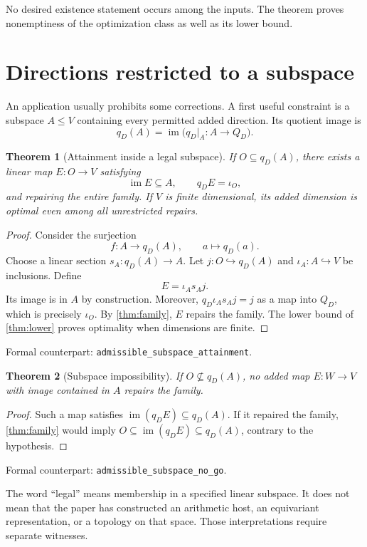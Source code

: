 \documentclass[11pt,letterpaper,oneside,openany]{book}
\theoremstyle{quiet}
\newtheorem{theorem}{Theorem}[chapter]
\DeclareMathOperator{\im}{im}
\newcommand{\formal}[1]{\par\nobreak\begingroup\footnotesize\color{Slate}\sffamily Formal counterpart: \normalfont\nolinkurl{#1}.\par\endgroup}
\begin{document}
No desired existence statement occurs among the inputs. The theorem proves nonemptiness of the optimization class as well as its lower bound.

\section{Directions restricted to a subspace}
An application usually prohibits some corrections. A first useful constraint is a subspace $A\leq V$ containing every permitted added direction. Its quotient image is
\[
q_D(A)=\im\bigl(q_D\vert_A:A\to Q_D\bigr).
\]

\begin{theorem}[Attainment inside a legal subspace]\label{thm:legal}
If $O\subseteq q_D(A)$, there exists a linear map $E:O\to V$ satisfying
\[
\im E\subseteq A,\qquad q_DE=\iota_O,
\]
and repairing the entire family. If $V$ is finite dimensional, its added dimension is optimal even among all unrestricted repairs.
\end{theorem}
\begin{proof}
Consider the surjection
\[
f:A\longrightarrow q_D(A),\qquad a\longmapsto q_D(a).
\]
Choose a linear section $s_A:q_D(A)\to A$. Let $j:O\hookrightarrow q_D(A)$ and $\iota_A:A\hookrightarrow V$ be inclusions. Define
\[
E=\iota_As_Aj.
\]
Its image is in $A$ by construction. Moreover, $q_D\iota_As_Aj=j$ as a map into $Q_D$, which is precisely $\iota_O$. By \cref{thm:family}, $E$ repairs the family. The lower bound of \cref{thm:lower} proves optimality when dimensions are finite.
\end{proof}
\formal{admissible_subspace_attainment}

\begin{theorem}[Subspace impossibility]\label{thm:legal-no-go}
If $O\not\subseteq q_D(A)$, no added map $E:W\to V$ with image contained in $A$ repairs the family.
\end{theorem}
\begin{proof}
Such a map satisfies $\im(q_DE)\subseteq q_D(A)$. If it repaired the family, \cref{thm:family} would imply $O\subseteq\im(q_DE)\subseteq q_D(A)$, contrary to the hypothesis.
\end{proof}
\formal{admissible_subspace_no_go}

The word ``legal'' means membership in a specified linear subspace. It does not mean that the paper has constructed an arithmetic host, an equivariant representation, or a topology on that space. Those interpretations require separate witnesses.
\end{document}
